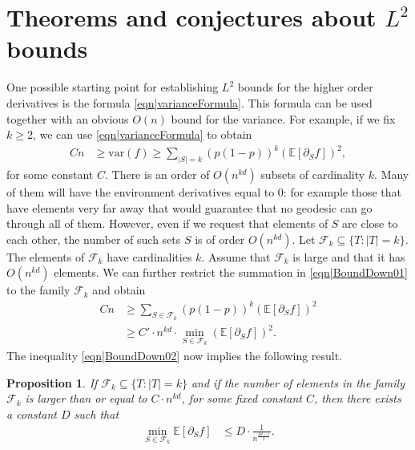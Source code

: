 \documentclass[reqno]{amsart}
\newtheorem{proposition}{Proposition}
\begin{document}
\section{Theorems and conjectures about $L^2$ bounds} \label{sec|L2Bounds}
One possible starting point for establishing $L^2$ bounds for the higher order derivatives is  the formula \eqref{eqn|varianceFormula}. This formula can be used together with an obvious $O(n)$ bound for the variance. 
For example, if we fix $k\geq 2$, we can use 
\eqref{eqn|varianceFormula} to obtain 
\begin{align}Cn&\geq \text{var}(f)\geq \sum_{|S|=k}\left(p(1-p)\right)^k \left(\mathbb E\left[\partial_Sf\right]\right)^2,
\label{eqn|BoundDown01}
\end{align}
for some constant $C$. 
There is an order of $O(n^{kd})$ subsets of cardinality $k$. Many of them will have the environment derivatives equal to $0$: for example those that have elements very far away that would guarantee that no geodesic can go through all of them. However, 
even if we request that elements of $S$ are close to each other, the number of such sets $S$ is of order $O(n^{kd})$. 
Let $\mathcal F_k\subseteq\{T:|T|=k\}$. The elements of $\mathcal F_k$ have cardinalities $k$. Assume that $\mathcal F_k$ is large and that it has $O(n^{kd})$ elements. We can further restrict the summation in \eqref{eqn|BoundDown01} to the family $\mathcal F_k$ and obtain 
\begin{align}Cn&\geq  \sum_{S\in \mathcal F_k}\left(p(1-p)\right)^k \left(\mathbb E\left[\partial_Sf\right]\right)^2 \nonumber \\
&\geq C'\cdot n^{kd}\cdot\min_{S\in\mathcal F_k}\left( \mathbb E\left[\partial_Sf\right]\right)^2.
\label{eqn|BoundDown02}
\end{align}
The inequality \eqref{eqn|BoundDown02} now implies the following result.
\begin{proposition}\label{thm|EasyBound} If $\mathcal F_k\subseteq\{T:|T|=k\}$ and if the number of elements in the family $\mathcal F_k$ is larger than or equal to $C\cdot n^{kd}$, for some fixed constant $C$, then there exists a constant $D$ such that 
\begin{align*}
\min_{S\in\mathcal F_k}\mathbb E\left[\partial_Sf\right] &\leq D\cdot\frac1{n^{\frac{kd-1}2}}.
\end{align*}
 \end{proposition}
\end{document}
